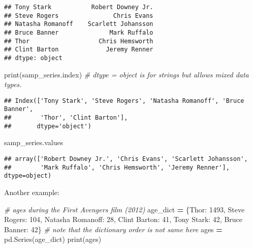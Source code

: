 \documentclass[
]{book}
\newenvironment{Shaded}{\begin{snugshade}}{\end{snugshade}}
\newcommand{\BuiltInTok}[1]{#1}
\newcommand{\CommentTok}[1]{\textcolor[rgb]{0.56,0.35,0.01}{\textit{#1}}}
\newcommand{\DecValTok}[1]{\textcolor[rgb]{0.00,0.00,0.81}{#1}}
\newcommand{\NormalTok}[1]{#1}
\newcommand{\OperatorTok}[1]{\textcolor[rgb]{0.81,0.36,0.00}{\textbf{#1}}}
\newcommand{\StringTok}[1]{\textcolor[rgb]{0.31,0.60,0.02}{#1}}
\begin{document}
\begin{verbatim}
## Tony Stark           Robert Downey Jr.
## Steve Rogers               Chris Evans
## Natasha Romanoff    Scarlett Johansson
## Bruce Banner              Mark Ruffalo
## Thor                   Chris Hemsworth
## Clint Barton             Jeremy Renner
## dtype: object
\end{verbatim}

\begin{Shaded}
\begin{Highlighting}[]
\BuiltInTok{print}\NormalTok{(samp\_series.index) }\CommentTok{\# dtype = object is for strings but allows mixed data types.}
\end{Highlighting}
\end{Shaded}

\begin{verbatim}
## Index(['Tony Stark', 'Steve Rogers', 'Natasha Romanoff', 'Bruce Banner',
##        'Thor', 'Clint Barton'],
##       dtype='object')
\end{verbatim}

\begin{Shaded}
\begin{Highlighting}[]
\NormalTok{samp\_series.values}
\end{Highlighting}
\end{Shaded}

\begin{verbatim}
## array(['Robert Downey Jr.', 'Chris Evans', 'Scarlett Johansson',
##        'Mark Ruffalo', 'Chris Hemsworth', 'Jeremy Renner'], dtype=object)
\end{verbatim}

Another example:

\begin{Shaded}
\begin{Highlighting}[]
\CommentTok{\# ages during the First Avengers film (2012)}
\NormalTok{age\_dict }\OperatorTok{=}\NormalTok{ \{}\StringTok{\textquotesingle{}Thor\textquotesingle{}}\NormalTok{: }\DecValTok{1493}\NormalTok{,}
            \StringTok{\textquotesingle{}Steve Rogers\textquotesingle{}}\NormalTok{: }\DecValTok{104}\NormalTok{,}
            \StringTok{\textquotesingle{}Natasha Romanoff\textquotesingle{}}\NormalTok{: }\DecValTok{28}\NormalTok{,}
            \StringTok{\textquotesingle{}Clint Barton\textquotesingle{}}\NormalTok{: }\DecValTok{41}\NormalTok{,}
            \StringTok{\textquotesingle{}Tony Stark\textquotesingle{}}\NormalTok{: }\DecValTok{42}\NormalTok{,}
            \StringTok{\textquotesingle{}Bruce Banner\textquotesingle{}}\NormalTok{: }\DecValTok{42}\NormalTok{\} }\CommentTok{\# note that the dictionary order is not same here}
\NormalTok{ages }\OperatorTok{=}\NormalTok{ pd.Series(age\_dict)}
\BuiltInTok{print}\NormalTok{(ages)}
\end{Highlighting}
\end{Shaded}
\end{document}
